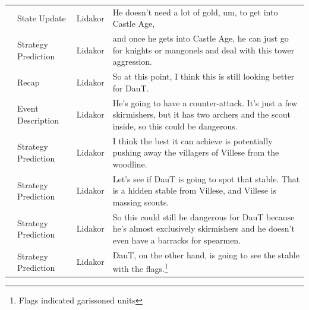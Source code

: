 {\begin{longtable}{@{}>{\theAppRow}r|L{2.3cm}L{1.0cm}U{11.55cm}@{}}
    & State Update          & Lidakor & He doesn't need a lot of gold, um, to get into Castle Age,                                                                                                                                                                                                                                      \\
    & Strategy Prediction   & Lidakor & and once he gets into Castle Age, he can just go for knights or mangonels and deal with this tower aggression.                                                                                                                                                                                  \\
    & Recap                 & Lidakor & So at this point, I think this is still looking better for DauT.                                                                                                                                                                                                                                \\
    & Event Description     & Lidakor & He's going to have a counter-attack. It's just a few skirmishers, but it has two archers and the scout inside, so this could be dangerous.                                                                                                                                                      \\
    & Strategy Prediction   & Lidakor & I think the best it can achieve is potentially pushing away the villagers of Villese from the woodline.                                                                                                                                                                                         \\
    & Strategy Prediction   & Lidakor & Let's see if DauT is going to spot that stable. That is a hidden stable from Villese, and Villese is massing scouts.                                                                                                                                                                            \\
    & Strategy Prediction   & Lidakor & So this could still be dangerous for DauT because he's almost exclusively skirmishers and he doesn't even have a barracks for spearmen.                                                                                                                                                         \\
    & Strategy Prediction   & Lidakor & DauT, on the other hand, is going to see the stable with the flags.\footnote{Flags indicated garissoned units}                                                                                                                                                                                                                             \\

\end{longtable}}
